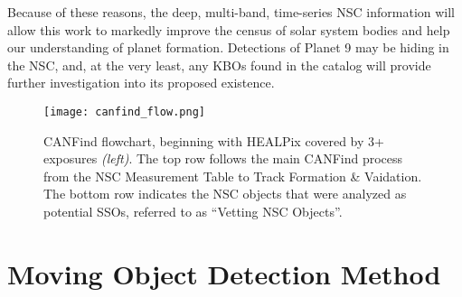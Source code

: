 \documentclass[twocolumn]{aastex62}
\begin{document}
Because of these reasons, the deep, multi-band, time-series NSC information will allow this work to markedly improve the census of solar system bodies and help our understanding of planet formation.  Detections of Planet 9 may be hiding in the NSC, and, at the very least, any KBOs found in the catalog will provide further investigation into its proposed existence.  





\begin{figure*}[ht]
\centering
\texttt{[image: canfind\_flow.png]}
\caption{CANFind flowchart, beginning with HEALPix covered by 3+ exposures \textit{(left)}.  The top row follows the main CANFind process from the NSC Measurement Table to Track Formation \& Vaidation.  The bottom row indicates the NSC objects that were analyzed as potential SSOs, referred to as ``Vetting NSC Objects''.}
\label{fig:flow}
\end{figure*}


\section{Moving Object Detection Method}
\label{sec:meth}
\end{document}
